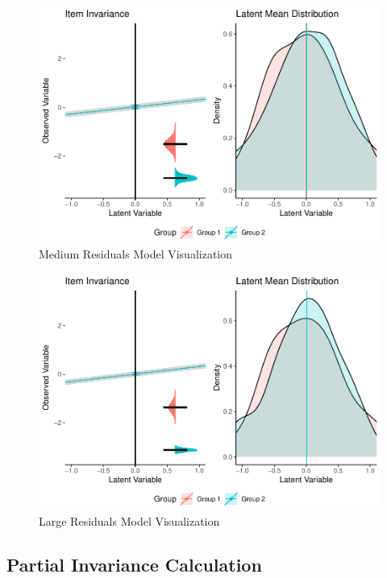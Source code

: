 \documentclass[
  man]{apa7}
\begin{document}
\begin{figure}
\centering
\includegraphics{manuscript_files/figure-latex/med-res-pic-1.pdf}
\caption{\label{fig:med-res-pic}Medium Residuals Model Visualization}
\end{figure}

\begin{figure}
\centering
\includegraphics{manuscript_files/figure-latex/large-res-pic-1.pdf}
\caption{\label{fig:large-res-pic}Large Residuals Model Visualization}
\end{figure}

\hypertarget{partial-invariance-calculation}{%
\subsection{Partial Invariance Calculation}\label{partial-invariance-calculation}}
\end{document}
